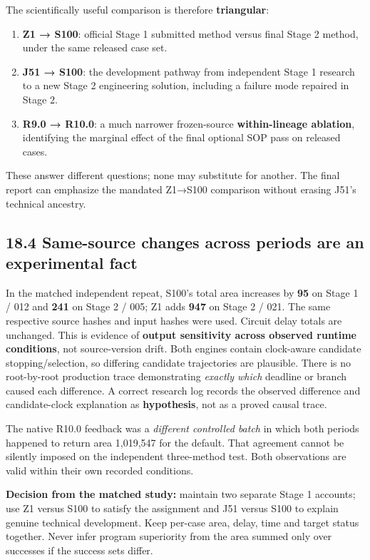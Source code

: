 The scientifically useful comparison is therefore \textbf{triangular}:

\begin{enumerate}
\def\labelenumi{\arabic{enumi}.}
\tightlist
\item
  \textbf{Z1 → S100}: official Stage 1 submitted method versus final Stage 2 method, under the same released case set.
\item
  \textbf{J51 → S100}: the development pathway from independent Stage 1 research to a new Stage 2 engineering solution, including a failure mode repaired in Stage 2.
\item
  \textbf{R9.0 → R10.0}: a much narrower frozen-source \textbf{within-lineage ablation}, identifying the marginal effect of the final optional SOP pass on released cases.
\end{enumerate}

These answer different questions; none may substitute for another. The final report can emphasize the mandated Z1→S100 comparison without erasing J51's technical ancestry.

\subsection{18.4 Same-source changes across periods are an experimental fact}\label{same-source-changes-across-periods-are-an-experimental-fact}

In the matched independent repeat, S100's total area increases by \textbf{95} on Stage 1 / 012 and \textbf{241} on Stage 2 / 005; Z1 adds \textbf{947} on Stage 2 / 021. The same respective source hashes and input hashes were used. Circuit delay totals are unchanged. This is evidence of \textbf{output sensitivity across observed runtime conditions}, not source-version drift. Both engines contain clock-aware candidate stopping/selection, so differing candidate trajectories are plausible. There is no root-by-root production trace demonstrating \emph{exactly which} deadline or branch caused each difference. A correct research log records the observed difference and candidate-clock explanation as \textbf{hypothesis}, not as a proved causal trace.

The native R10.0 feedback was a \emph{different controlled batch} in which both periods happened to return area 1,019,547 for the default. That agreement cannot be silently imposed on the independent three-method test. Both observations are valid within their own recorded conditions.

\textbf{Decision from the matched study:} maintain two separate Stage 1 accounts; use Z1 versus S100 to satisfy the assignment and J51 versus S100 to explain genuine technical development. Keep per-case area, delay, time and target status together. Never infer program superiority from the area summed only over successes if the success sets differ.

